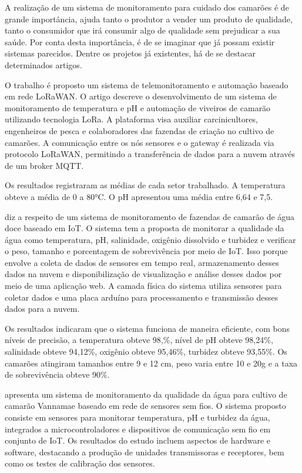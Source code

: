 A realização de um sistema de monitoramento para cuidado dos camarões é de grande importância, ajuda tanto o produtor a vender um produto de qualidade, tanto o consumidor que irá consumir algo de qualidade sem prejudicar a sua saúde. Por conta desta importância, é de se imaginar que já possam existir sistemas parecidos. Dentre os projetos já existentes, há de se destacar determinados artigos.

O trabalho \cite{dantas2020} é proposto um sistema de telemonitoramento e automação baseado em rede LoRaWAN. O artigo descreve o desenvolvimento de um sistema de monitoramento de temperatura e pH e automação de viveiros de camarão utilizando tecnologia LoRa. A plataforma visa auxiliar carcinicultores, engenheiros de pesca e colaboradores das fazendas de criação no cultivo de camarões. A comunicação entre os nós sensores e o gateway é realizada via protocolo LoRaWAN, permitindo a transferência de dados para a nuvem através de um broker MQTT.  

Os resultados registraram as médias de cada setor trabalhado. A temperatura obteve a média de 0 a 80°C. O pH apresentou uma média entre 6,64 e 7,5.

\cite{Uddin2020} diz a respeito de um sistema de monitoramento de fazendas de camarão de água doce baseado em IoT. O sistema tem a proposta de monitorar a qualidade da água como temperatura, pH, salinidade, oxigênio dissolvido e turbidez e verificar o peso, tamanho e porcentagem de sobrevivência por meio de IoT. Isso porque envolve a coleta de dados de sensores em tempo real, armazenamento desses dados na nuvem e disponibilização de visualização e análise desses dados por meio de uma aplicação web. A camada física do sistema utiliza sensores para coletar dados e uma placa arduíno para processamento e transmissão desses dados para a nuvem.

Os resultados indicaram que o sistema funciona de maneira eficiente, com bons níveis de precisão, a temperatura obteve 98,\%, nível de pH obteve 98,24\%, salinidade obteve 94,12\%, oxigênio obteve 95,46\%, turbidez obteve 93,55\%. Os camarões atingiram tamanhos entre 9 e 12 cm, peso varia entre 10 e 20g e a taxa de sobrevivência obteve 90\%. 

\cite{Zainuddin2019} apresenta um sistema de monitoramento da qualidade da água para cultivo de camarão Vannamae baseado em rede de sensores sem fios. O sistema proposto consiste em sensores para monitorar temperatura, pH e turbidez da água, integrados a microcontroladores e dispositivos de comunicação sem fio em conjunto de IoT. Os resultados do estudo incluem aspectos de hardware e software, destacando a produção de unidades transmissoras e receptores, bem como os testes de calibração dos sensores.

